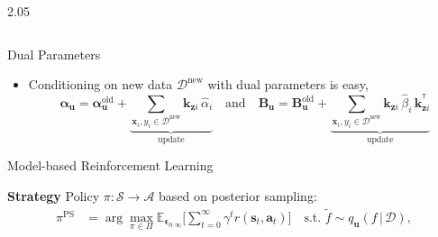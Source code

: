 \documentclass[final,12pt]{beamer}
\newlength{\colwidth}
\newcommand{\action}{\ensuremath{\mathbf{a}}}
\newcommand{\mathbold}[1]{\bm{#1}}
\newcommand{\mbf}[1]{\mathbf{#1}}
\newcommand{\T}{^\mathsf{T}}
\newcommand{\valpha}[0]{\mathbold{\alpha}}
\renewcommand{\mid}{\,|\,}
\newcommand{\vu}{\mbf{u}}
\newcommand{\vx}{\mbf{x}}
\newcommand{\vkzi}{\mbf{k}_{\mbf{z}i}}
\newcommand{\MBeta}[0]{\mathbold{B}}
\newcommand{\R}{\mathbb{R}}
\newcommand{\state}{\ensuremath{\mathbf{s}}}
\newcommand{\noise}{\ensuremath{\bm\epsilon}}
\newcommand{\discount}{\ensuremath{\gamma}}
\newcommand{\dataset}{\ensuremath{\mathcal{D}}}
\newcommand{\stateDomain}{\ensuremath{\mathcal{S}}}
\newcommand{\actionDomain}{\ensuremath{\mathcal{A}}}
\newcommand{\rewardFn}{\ensuremath{r}}
\newcommand{\transitionFn}{\ensuremath{f}}
\newcommand{\policy}{\ensuremath{\pi}}
\begin{document}
\begin{frame}[t]
\begin{columns}[t]
\begin{column}{2.05\colwidth}
\begin{columns}[t]
\begin{column}{\colwidth}
\begin{block}{Dual Parameters}
\begin{itemize}
        \item Conditioning on new data $\dataset^{\text{new}}$ with \alert{dual parameters} is easy, %
            \begin{equation}
            \valpha_{\vu}  = \valpha_{\vu}^{\text{old}} +  \underbrace{\sum_{\vx_{i},y_{i} \in \dataset^{\text{new}}}  \vkzi \, \hat{\alpha}_{i}}_{\text{update}} %
            \quad \text{and} \quad
            \MBeta_{\vu} = \MBeta_{\vu}^{\text{old}} +  \underbrace{\sum_{\vx_{i},y_{i} \in \dataset^{\text{new}}} \vkzi \,\hat{\beta}_{i} \, \vkzi^{\T}}_{\text{update}} %
            \nonumber
            \end{equation}
        \end{itemize}

    \end{block}



    \begin{block}{Model-based Reinforcement Learning}


        \alert{\bf Strategy} Policy \(\pi : \stateDomain \rightarrow \actionDomain\) based on posterior sampling:
        \begin{align} \label{eq-posterior-sampling}
        \policy^{\text{PS}} &= \arg \max_{\pi \in \Pi} \mathbb{E}_{\noise_{0:\infty}} \bigg[ \sum_{t=0}^{\infty} \discount^{t} \rewardFn(\state_{t},\action_{t}) \bigg]
        \quad \text{s.t. } \tilde{\transitionFn} \sim q_{\mathbf{u}}({\transitionFn} \mid \dataset),
        \end{align}

        \newcommand{\lab}[1]{\protect\tikz[baseline=-.5ex]{\protect\node[minimum width=1.5em,minimum height=.8em,fill=#1,opacity=.1](a){};\protect\draw[#1,semithick](a.west)--(a.east);}}


\end{block}
\end{column}
\end{columns}
\end{column}
\end{columns}
\end{frame}
\end{document}
